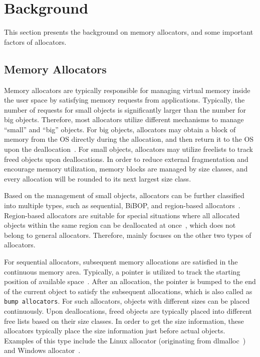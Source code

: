 \section{Background}

This section presents the background on memory allocators, and some important factors of allocators. 

\subsection{Memory Allocators}

\label{sec:allocator}
Memory allocators are typically responsible for managing virtual memory inside the user space by satisfying memory requests from applications. Typically, the number of requests for small objects is significantly larger than the number for big objects. Therefore, most allocators utilize different mechanisms to manage ``small'' and ``big'' objects. For big objects, allocators may obtain a block of memory from the OS directly during the allocation, and then return it to the OS upon the deallocation~\cite{Hoard}. For small objects,  allocators may utilize freelists to track freed objects upon deallocations. In order to reduce external fragmentation and encourage memory utilization, memory blocks are managed by size classes, and every allocation will be rounded to its next largest size class.  

Based on the management of small objects, allocators can be further classified into multiple types, such as sequential, BiBOP, and region-based allocators~\cite{DieHarder, Gay:1998:MME:277650.277748}. Region-based allocators are suitable for special situations where all allocated objects within the same region can be deallocated at once~\cite{Gay:1998:MME:277650.277748}, which does not belong to general allocators. Therefore, \MP{} mainly focuses on the other two types of allocators. 

For sequential allocators, subsequent memory allocations are satisfied in the continuous memory area. Typically, a pointer is utilized to track the starting position of available space~\cite{Cling}. After an allocation, the pointer is bumped to the end of the current object to satisfy the subsequent allocations, which is also called as \texttt{bump allocators}. For such allocators, objects with different sizes can be placed continuously. Upon deallocations, freed objects are typically placed into different free lists based on their size classes. In order to get the size information, these allocators typically place the size information just before actual objects. Examples of this type include the Linux allocator (originating from dlmalloc~\cite{dlmalloc}) and Windows allocator~\cite{DieHarder}.  

